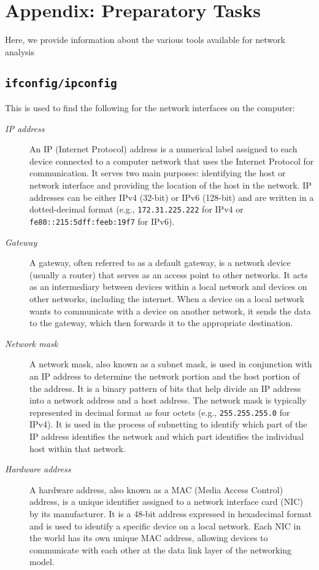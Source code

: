 \section{Appendix: Preparatory Tasks}
Here, we provide information about the various tools available for network analysis

\subsection{\texttt{ifconfig/ipconfig}}
  This is used to find the following for the network interfaces on the computer:
    \begin{description}
        \item[\textit{IP address}] An IP (Internet Protocol) address is a numerical label assigned to each device connected to a computer network that uses the Internet Protocol for communication. It serves two main purposes: identifying the host or network interface and providing the location of the host in the network. IP addresses can be either IPv4 (32-bit) or IPv6 (128-bit) and are written in a dotted-decimal format (e.g., {\tt172.31.225.222} for IPv4 or {\tt fe80::215:5dff:feeb:19f7} for IPv6).
        \item[\textit{Gateway}] A gateway, often referred to as a default gateway, is a network device (usually a router) that serves as an access point to other networks. It acts as an intermediary between devices within a local network and devices on other networks, including the internet. When a device on a local network wants to communicate with a device on another network, it sends the data to the gateway, which then forwards it to the appropriate destination.
        \item[\textit{Network mask}] A network mask, also known as a subnet mask, is used in conjunction with an IP address to determine the network portion and the host portion of the address. It is a binary pattern of bits that help divide an IP address into a network address and a host address. The network mask is typically represented in decimal format as four octets (e.g., {\tt255.255.255.0} for IPv4). It is used in the process of subnetting to identify which part of the IP address identifies the network and which part identifies the individual host within that network.
        \item[\textit{Hardware address}] A hardware address, also known as a MAC (Media Access Control) address, is a unique identifier assigned to a network interface card (NIC) by its manufacturer. It is a 48-bit address expressed in hexadecimal format and is used to identify a specific device on a local network. Each NIC in the world has its own unique MAC address, allowing devices to communicate with each other at the data link layer of the networking model.

\end{description}
